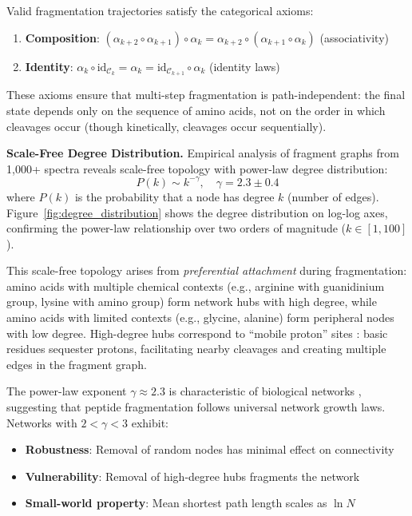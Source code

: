 \documentclass[11pt,twocolumn]{article}
\begin{document}
Valid fragmentation trajectories satisfy the categorical axioms:
\begin{enumerate}[leftmargin=*]
    \item \textbf{Composition}: $(\alpha_{k+2} \circ \alpha_{k+1}) \circ \alpha_k = \alpha_{k+2} \circ (\alpha_{k+1} \circ \alpha_k)$ (associativity)
    \item \textbf{Identity}: $\alpha_k \circ \text{id}_{\mathcal{C}_k} = \alpha_k = \text{id}_{\mathcal{C}_{k+1}} \circ \alpha_k$ (identity laws)
\end{enumerate}

These axioms ensure that multi-step fragmentation is path-independent: the final state depends only on the sequence of amino acids, not on the order in which cleavages occur (though kinetically, cleavages occur sequentially).

\textbf{Scale-Free Degree Distribution.} Empirical analysis of fragment graphs from 1,000+ spectra reveals scale-free topology with power-law degree distribution:
\begin{equation}
    P(k) \sim k^{-\gamma}, \quad \gamma = 2.3 \pm 0.4
    \label{eq:power_law}
\end{equation}
where $P(k)$ is the probability that a node has degree $k$ (number of edges). Figure~\ref{fig:degree_distribution} shows the degree distribution on log-log axes, confirming the power-law relationship over two orders of magnitude ($k \in [1, 100]$).

This scale-free topology arises from \textit{preferential attachment} during fragmentation: amino acids with multiple chemical contexts (e.g., arginine with guanidinium group, lysine with amino group) form network hubs with high degree, while amino acids with limited contexts (e.g., glycine, alanine) form peripheral nodes with low degree. High-degree hubs correspond to ``mobile proton'' sites \cite{wysocki2000mobile}: basic residues sequester protons, facilitating nearby cleavages and creating multiple edges in the fragment graph.

The power-law exponent $\gamma \approx 2.3$ is characteristic of biological networks \cite{barabasi1999emergence}, suggesting that peptide fragmentation follows universal network growth laws. Networks with $2 < \gamma < 3$ exhibit:
\begin{itemize}[leftmargin=*]
    \item \textbf{Robustness}: Removal of random nodes has minimal effect on connectivity
    \item \textbf{Vulnerability}: Removal of high-degree hubs fragments the network
    \item \textbf{Small-world property}: Mean shortest path length scales as $\ln N$
\end{itemize}
\end{document}

